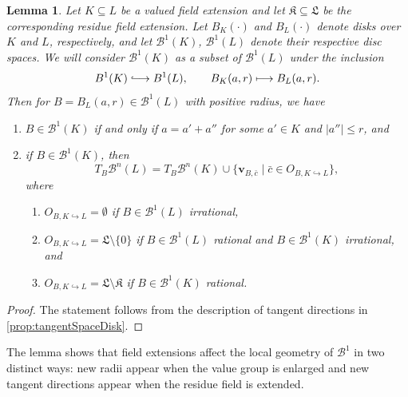 \documentclass[10pt]{article}
\newtheorem{lemma}[theorem]{Lemma}
\theoremstyle{definition}
\renewcommand{\vec}[1]{\mathbf{#1}}
\begin{document}
\begin{lemma}
  \label{lem:extension}
  Let $K\subseteq L$ be a valued field extension and let $\mathfrak K\subseteq \mathfrak L$ be the corresponding residue field extension.  Let $B_K(\cdot)$ and $B_L(\cdot)$ denote disks over $K$ and $L$, respectively, and let $\mathcal B^1(K)$, $\mathcal B^1(L)$ denote their respective disc spaces.  We will consider $\mathcal B^1(K)$ as a subset of $\mathcal B^1(L)$ under the inclusion
  \begin{equation*}
    B^1(K)\lhook\joinrel\longrightarrow B^1(L), \qquad B_K(a,r) \longmapsto B_L(a,r).
  \end{equation*}
  Then for $B=B_L(a,r)\in\mathcal B^1(L)$ with positive radius, we have
  \begin{enumerate}
  \item $B\in \mathcal B^1(K)$ if and only if $a=a'+a''$ for some $a'\in K$ and $|a''|\leq r$, and
  \item if $B\in \mathcal B^1(K)$, then
  \begin{equation*}
    T_B\mathcal B^n(L) = T_B\mathcal B^n(K) \cup \{ \vec{v}_{B,\bar c}\mid \bar c\in O_{B,K\hookrightarrow L} \},
  \end{equation*}
  where
  \begin{enumerate}
  \item $O_{B,K\hookrightarrow L}=\emptyset$ if $B\in \mathcal B^1(L)$ irrational,
  \item $O_{B,K\hookrightarrow L}=\mathfrak L\setminus\{0\}$ if $B\in \mathcal B^1(L)$ rational and $B\in \mathcal B^1(K)$ irrational, and
  \item $O_{B,K\hookrightarrow L}=\mathfrak L\setminus\mathfrak K$ if $B\in \mathcal B^1(K)$ rational.
  \end{enumerate}
\end{enumerate}
\end{lemma}
\begin{proof}
  The statement follows from the description of tangent directions in \cref{prop:tangentSpaceDisk}.
\end{proof}

The lemma shows that field extensions affect the local geometry of $\mathcal B^1$ in two distinct ways: new radii appear when the value group is enlarged and new tangent directions appear when the residue field is extended.
\end{document}

